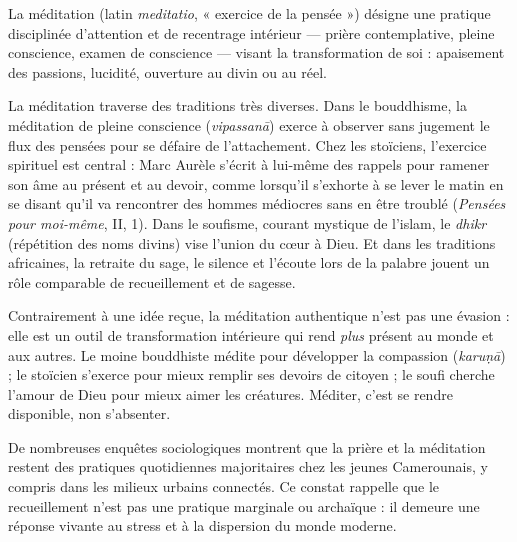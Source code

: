 \documentclass[11pt]{article}
\newcommand{\cle}[1]{{\popxbold\color{popdark}#1}}
\newcounter{popsec}
\newcounter{popsub}
\newcommand{\courssub}[1]{%
  \stepcounter{popsub}%
  \par\vspace{9pt}\noindent{\popxbold\fontsize{11.5}{13}\selectfont\color{popink}{\color{poporange}\thepopsec.\thepopsub}\hspace{6pt}#1}\par\nopagebreak\vspace{4pt}
}
\begin{document}
\begin{definition}[Méditation]
La \cle{méditation} (latin \emph{meditatio}, « exercice de la pensée ») désigne une pratique disciplinée d'attention et de recentrage intérieur — prière contemplative, pleine conscience, examen de conscience — visant la transformation de soi : apaisement des passions, lucidité, ouverture au divin ou au réel.
\end{definition}

La méditation traverse des traditions très diverses. Dans le \cle{bouddhisme}, la méditation de pleine conscience (\emph{vipassanā}) exerce à observer sans jugement le flux des pensées pour se défaire de l'attachement. Chez les \cle{stoïciens}, l'exercice spirituel est central : Marc Aurèle s'écrit à lui-même des rappels pour ramener son âme au présent et au devoir, comme lorsqu'il s'exhorte à se lever le matin en se disant qu'il va rencontrer des hommes médiocres sans en être troublé (\emph{Pensées pour moi-même}, II, 1). Dans le \cle{soufisme}, courant mystique de l'islam, le \emph{dhikr} (répétition des noms divins) vise l'union du cœur à Dieu. Et dans les traditions africaines, la retraite du sage, le silence et l'écoute lors de la palabre jouent un rôle comparable de recueillement et de sagesse.

\begin{propriete}
Contrairement à une idée reçue, la méditation authentique n'est pas une évasion : elle est un \cle{outil de transformation intérieure} qui rend \emph{plus} présent au monde et aux autres. Le moine bouddhiste médite pour développer la compassion (\emph{karuṇā}) ; le stoïcien s'exerce pour mieux remplir ses devoirs de citoyen ; le soufi cherche l'amour de Dieu pour mieux aimer les créatures. Méditer, c'est se rendre disponible, non s'absenter.
\end{propriete}

\begin{savaistu}
De nombreuses enquêtes sociologiques montrent que la prière et la méditation restent des pratiques quotidiennes majoritaires chez les jeunes Camerounais, y compris dans les milieux urbains connectés. Ce constat rappelle que le recueillement n'est pas une pratique marginale ou archaïque : il demeure une réponse vivante au stress et à la dispersion du monde moderne.
\end{savaistu}

\courssub{Le fanatisme : la religion dévoyée}
\end{document}
